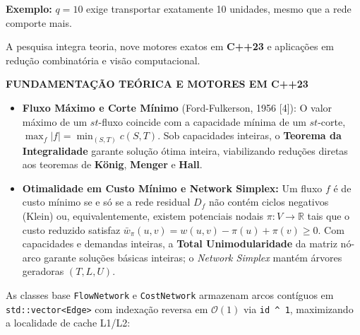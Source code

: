 \documentclass[final]{article}
\newcommand{\destaque}[1]{\textcolor{ufabcgreen}{\textbf{#1}}}
\newcommand{\postersection}[1]{
    \par\vspace{0.55em}
    {\fontsize{34}{40}\selectfont\bfseries\color{textdark}#1}
    \par\vspace{0.2em}
}
\begin{document}
\begin{minipage}[t]{41.275cm}
\textbf{Exemplo:} $q=10$ exige transportar exatamente 10 unidades, mesmo que a rede comporte mais.

A pesquisa integra teoria, nove motores exatos em \textbf{C++23} e aplicações em redução combinatória e visão computacional.

\postersection{FUNDAMENTAÇÃO TEÓRICA E MOTORES EM C++23}
\begin{itemize}[leftmargin=1.2em, itemsep=0.18em, topsep=0.1em]
    \item \destaque{Fluxo Máximo e Corte Mínimo} (Ford-Fulkerson, 1956 [4]): O valor máximo de um $st$-fluxo coincide com a capacidade mínima de um $st$-corte, $\max_f |f| = \min_{(S,T)} c(S,T)$. Sob capacidades inteiras, o \textbf{Teorema da Integralidade} garante solução ótima inteira, viabilizando reduções diretas aos teoremas de \textbf{König}, \textbf{Menger} e \textbf{Hall}.
    \item \destaque{Otimalidade em Custo Mínimo e Network Simplex:} Um fluxo $f$ é de custo mínimo se e só se a rede residual $D_f$ não contém ciclos negativos (Klein) ou, equivalentemente, existem potenciais nodais $\pi: V \to \mathbb{R}$ tais que o custo reduzido satisfaz $\bar{w}_\pi(u,v) = w(u,v) - \pi(u) + \pi(v) \ge 0$. Com capacidades e demandas inteiras, a \textbf{Total Unimodularidade} da matriz nó-arco garante soluções básicas inteiras; o \textit{Network Simplex} mantém árvores geradoras $(T, L, U)$.
\end{itemize}

As classes base \texttt{FlowNetwork} e \texttt{CostNetwork} armazenam arcos contíguos em \texttt{std::vector<Edge>} com indexação reversa em $\mathcal{O}(1)$ via \texttt{id \textasciicircum\ 1}, maximizando a localidade de cache L1/L2:


\end{minipage}
\end{document}
